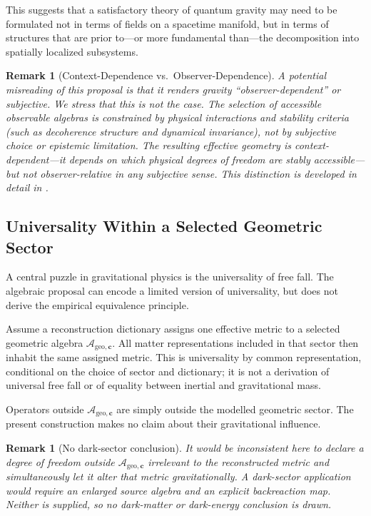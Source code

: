 \documentclass[12pt,a4paper]{article}
\newtheorem{remark}[theorem]{Remark}
\begin{document}
This suggests that a satisfactory theory of quantum gravity may need to be formulated not in terms of fields on a spacetime manifold, but in terms of structures that are prior to—or more fundamental than—the decomposition into spatially localized subsystems.

\begin{remark}[Context-Dependence vs.\ Observer-Dependence]
A potential misreading of this proposal is that it renders gravity ``observer-dependent'' or subjective. We stress that this is not the case. The selection of accessible observable algebras is constrained by physical interactions and stability criteria (such as decoherence structure and dynamical invariance), not by subjective choice or epistemic limitation. The resulting effective geometry is \emph{context-dependent}—it depends on which physical degrees of freedom are stably accessible—but not \emph{observer-relative} in any subjective sense. This distinction is developed in detail in \cite{Liu2026PaperB}.
\end{remark}

\subsection{Universality Within a Selected Geometric Sector}

A central puzzle in gravitational physics is the universality of free fall.  The algebraic proposal can encode a limited version of universality, but does not derive the empirical equivalence principle.

Assume a reconstruction dictionary assigns one effective metric to a selected geometric algebra $\mathcal{A}_{\mathrm{geo},\mathbf{c}}$.  All matter representations included in that sector then inhabit the same assigned metric.  This is universality by common representation, conditional on the choice of sector and dictionary; it is not a derivation of universal free fall or of equality between inertial and gravitational mass.

Operators outside $\mathcal{A}_{\mathrm{geo},\mathbf{c}}$ are simply outside the modelled geometric sector.  The present construction makes no claim about their gravitational influence.

\begin{remark}[No dark-sector conclusion]
It would be inconsistent here to declare a degree of freedom outside $\mathcal{A}_{\mathrm{geo},\mathbf{c}}$ irrelevant to the reconstructed metric and simultaneously let it alter that metric gravitationally.  A dark-sector application would require an enlarged source algebra and an explicit backreaction map.  Neither is supplied, so no dark-matter or dark-energy conclusion is drawn.
\end{remark}
\end{document}

